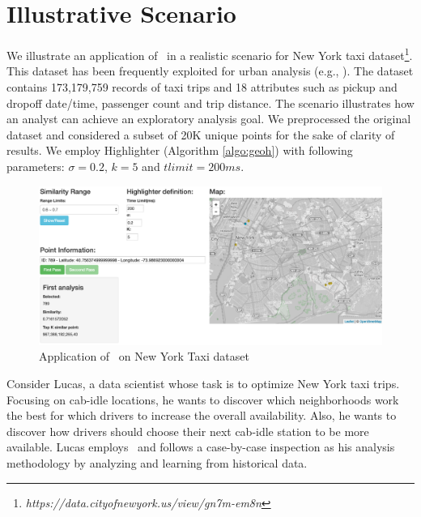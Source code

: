 \section{Illustrative Scenario}\label{sec:scenarios}
We illustrate an application of \framework\ in a realistic scenario for New York taxi dataset\footnote{\it https://data.cityofnewyork.us/view/gn7m-em8n}. This dataset has been frequently exploited for urban analysis
(e.g., \cite{DBLP:journals/debu/FreireCVZ16}).
The dataset contains 173,179,759 records of taxi trips and 18 attributes such as pickup and dropoff date/time, passenger count and trip distance.
The scenario illustrates how an analyst can achieve an exploratory analysis goal. We preprocessed the original dataset and considered a subset of 20K unique points for the sake of clarity of results. We employ {\sc Highlighter} (Algorithm \ref{algo:geoh}) with following parameters: $\sigma = 0.2$, $k = 5$ and $tlimit = 200ms$.

\begin{figure}
  \centering
  \includegraphics[width=\columnwidth]{figs/scenario2.png}
\caption{Application of \framework\ on New York Taxi dataset}
\label{fig:app}
\end{figure}

Consider Lucas, a data scientist whose task is to optimize New York taxi trips. Focusing on cab-idle locations, he wants to discover which neighborhoods work the best for which drivers to increase the overall availability. Also, he wants to discover how drivers should choose their next cab-idle station to be more available. Lucas employs \framework\ and follows a case-by-case inspection as his analysis methodology by analyzing and learning from historical data.

